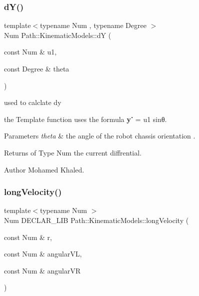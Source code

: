 \subsubsection{\texorpdfstring{d\+Y()}{dY()}\hspace{0.1cm}{\footnotesize\ttfamily [2/2]}}
{\footnotesize\ttfamily template$<$typename Num , typename Degree $>$ \\
Num Path\+::\+Kinematic\+Models\+::dY (\begin{DoxyParamCaption}\item[{const Num \&}]{u1,  }\item[{const Degree \&}]{theta }\end{DoxyParamCaption})}



used to calclate dy 

the Template function uses the formula {\bfseries y˙} = u1 sinθ. 
\begin{DoxyParams}{Parameters}
{\em theta} & the angle of the robot chassis orientation . \\
\hline
\end{DoxyParams}
\begin{DoxyReturn}{Returns}
of Type Num the current diffrential. 
\end{DoxyReturn}
\begin{DoxyAuthor}{Author}
Mohamed Khaled. 
\end{DoxyAuthor}
\mbox{\label{namespace_path_1_1_kinematic_models_a1d71a0052e6781a914b7734f61ccda59}} 
\subsubsection{\texorpdfstring{long\+Velocity()}{longVelocity()}\hspace{0.1cm}{\footnotesize\ttfamily [1/2]}}
{\footnotesize\ttfamily template$<$typename Num $>$ \\
Num D\+E\+C\+L\+A\+R\+\_\+\+L\+IB Path\+::\+Kinematic\+Models\+::long\+Velocity (\begin{DoxyParamCaption}\item[{const Num \&}]{r,  }\item[{const Num \&}]{angular\+VL,  }\item[{const Num \&}]{angular\+VR }\end{DoxyParamCaption})}



